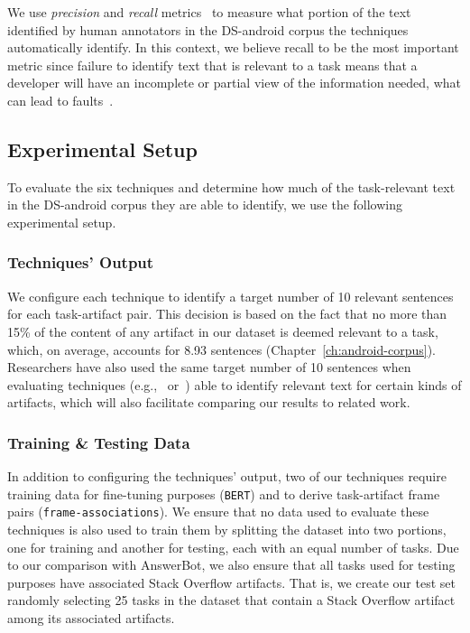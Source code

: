 




We use \textit{precision} and \textit{recall} metrics~\cite{manning2010IR} to measure what portion of the text identified by human annotators in the \acs{DS-android} corpus the techniques automatically identify.
In this context, we believe recall to be the most important metric since failure to identify text that is relevant to a task means that a developer will have an incomplete or partial view of the information needed,
what can lead to faults~\cite{Murphy2005}.




\subsection{Experimental Setup}

To evaluate the six techniques and determine how much of the task-relevant text in the \acs{DS-android} corpus they are able to identify, we use the following experimental setup.

\subsubsection{Techniques' Output}


We configure each technique to identify a target number of 10 relevant sentences for each task-artifact pair.
This decision is based on the fact that no more than 15\% of the content of any artifact in our dataset is deemed relevant to a task, which, on average, accounts for 8.93 sentences (Chapter~\ref{ch:android-corpus}).
Researchers have also used the same target number of 10 sentences when evaluating techniques  (e.g.,~\cite{Xu2017} or~\cite{Lotufo2012}) able to identify relevant text for certain kinds of artifacts, which will also facilitate comparing our results to related work.


\subsubsection{Training \& Testing Data}


In addition to configuring the techniques' output, two of our techniques require training data for fine-tuning purposes (\texttt{BERT}) and to derive task-artifact frame pairs (\texttt{frame-associations}).
We ensure that no data used to evaluate these techniques is also used to train them by 
splitting the dataset into two portions, one for training and another for testing, each with an equal number of tasks.
Due to our comparison with AnswerBot, we also ensure that all tasks used for testing purposes have associated Stack Overflow artifacts.
That is, we create our test set randomly selecting 25 tasks in the dataset that contain a 
Stack Overflow artifact among its associated artifacts.



